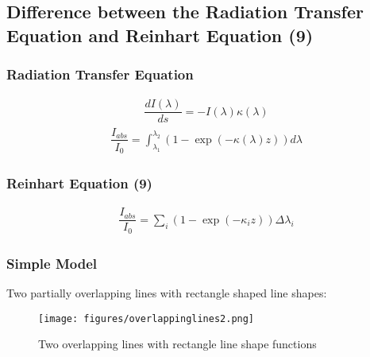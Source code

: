 \subsection{Difference between the Radiation Transfer Equation and Reinhart Equation (9)}

\subsubsection{Radiation Transfer Equation}

\begin{align}
	\dfrac{d I(\lambda)}{ds} = - I(\lambda) \kappa(\lambda)
\end{align}
\begin{align}
	\dfrac{I_{abs}}{I_0} = \int_{\lambda_1}^{\lambda_2} \left(1 - \exp(-\kappa(\lambda) z)\right) d \lambda
\end{align}

\subsubsection{Reinhart Equation (9)}

\begin{align}
	\dfrac{I_{abs}}{I_0} = \sum_i (1 - \exp(-\kappa_i z)) \Delta \lambda_i
\end{align}

\subsubsection{Simple Model}

Two partially overlapping lines with rectangle shaped line shapes:
\begin{figure}[ht]
	\texttt{[image: figures/overlappinglines2.png]}
	\caption{Two overlapping lines with rectangle line shape functions}
	\label{fig:overlappinglines}
\end{figure}

